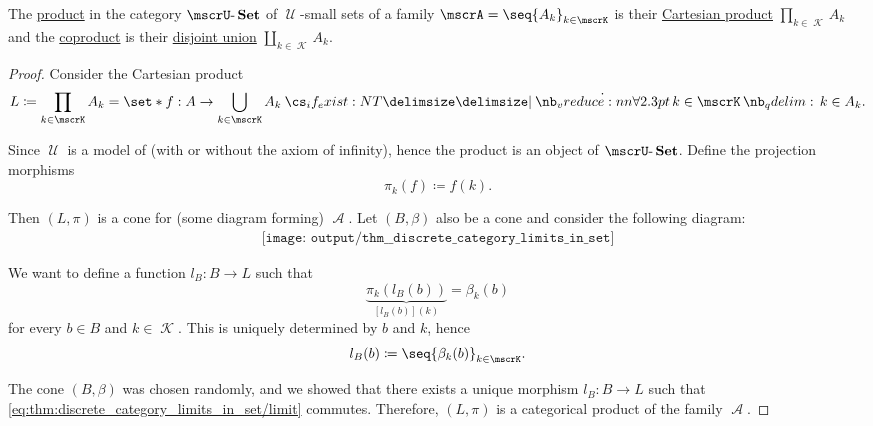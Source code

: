 \begin{proposition}\label{thm:discrete_category_limits_in_set}
  The \hyperref[def:discrete_category_limits]{product} in the category \hyperref[def:category_of_small_sets]{\( \ucat{Set} \)} of \( \mscrU \)-small sets of a family \( \mscrA = \seq{ A_k }_{k \in \mscrK} \) is their \hyperref[def:cartesian_product/product]{Cartesian product} \( \prod_{k \in \mscrK} A_k \) and the \hyperref[def:discrete_category_limits]{coproduct} is their \hyperref[def:disjoint_union]{disjoint union} \( \coprod_{k \in \mscrK} A_k \).
\end{proposition}
\begin{proof}
   Consider the Cartesian product
  \begin{equation*}
    L \coloneqq \prod_{k \in \mscrK} A_k = \set*{ f: A \to \bigcup_{k \in \mscrK} A_k \given* \qforall {k \in \mscrK} k \in A_k }.
  \end{equation*}

  Since \( \mscrU \) is a model of  (with or without the axiom of infinity), hence the product is an object of \( \ucat{Set} \). Define the projection morphisms
  \begin{equation*}
    \pi_k(f) \coloneqq f(k).
  \end{equation*}

  Then \( (L, \pi) \) is a cone for (some diagram forming) \( \mscrA \). Let \( (B, \beta) \) also be a cone and consider the following diagram:
  \begin{equation}\label{eq:thm:discrete_category_limits_in_set/limit}
    \begin{aligned}
      \texttt{[image: output/thm\_\_discrete\_category\_limits\_in\_set]}
    \end{aligned}
  \end{equation}

  We want to define a function \( l_B: B \to L \) such that
  \begin{equation*}
    \underbrace{ \pi_k(l_B(b)) }_{[l_B(b)](k)} = \beta_k(b)
  \end{equation*}
  for every \( b \in B \) and \( k \in \mscrK \). This is uniquely determined by \( b \) and \( k \), hence
  \begin{equation*}
    l_B(b) \coloneqq \seq{ \beta_k(b) }_{k \in \mscrK}.
  \end{equation*}

  The cone \( (B, \beta) \) was chosen randomly, and we showed that there exists a unique morphism \( l_B: B \to L \) such that \eqref{eq:thm:discrete_category_limits_in_set/limit} commutes. Therefore, \( (L, \pi) \) is a categorical product of the family \( \mscrA \).


\end{proof}
